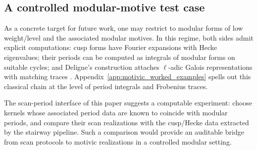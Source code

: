 \subsection{A controlled modular-motive test case}
\label{sec:controlled_modular_motive_case}

As a concrete target for future work, one may restrict to modular forms of low weight/level and the associated modular motives. In this regime, both sides admit explicit computations: cusp forms have Fourier expansions with Hecke eigenvalues; their periods can be computed as integrals of modular forms on suitable cycles; and Deligne's construction attaches $\ell$-adic Galois representations with matching traces \cite{Deligne1971Bourbaki,Deligne1974}. Appendix~\ref{app:motivic_worked_examples} spells out this classical chain at the level of period integrals and Frobenius traces.

The scan-period interface of this paper suggests a computable experiment: choose kernels whose associated period data are known to coincide with modular periods, and compare their scan realizations with the cusp/Hecke data extracted by the stairway pipeline. Such a comparison would provide an auditable bridge from scan protocols to motivic realizations in a controlled modular setting.


